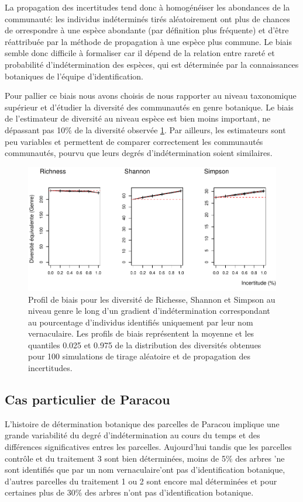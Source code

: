 \documentclass[
  11pt,
  french,
  A4paper,
  extrafontsizes,onecolumn,openright
  ]{memoir}
\begin{document}
La propagation des incertitudes tend donc à homogénéiser les abondances
de la communauté: les individus indéterminés tirés aléatoirement ont
plus de chances de orrespondre à une espèce abondante (par définition
plus fréquente) et d'être réattribuée par la méthode de propagation à
une espèce plus commune. Le biais semble donc difficile à formaliser car
il dépend de la relation entre rareté et probabilité d'indétermination
des espèces, qui est déterminée par la connaissances botaniques de
l'équipe d'identification.

Pour pallier ce biais nous avons choisis de nous rapporter au niveau
taxonomique supérieur et d'étudier la diversité des communautés en genre
botanique. Le biais de l'estimateur de diversité au niveau espèce est
bien moins important, ne dépassant pas 10\% de la diversité observée
\ref{fig:FigTreesGenus}. Par ailleurs, les estimateurs sont peu
variables et permettent de comparer correctement les communautés
communautés, pourvu que leurs degrés d'indétermination soient
similaires.

\begin{figure}

{\centering \includegraphics[width=0.6\linewidth]{MyBook_files/figure-latex/FigTreesGenus-1} 

}

\caption{Profil de biais pour les diversité de Richesse, Shannon et Simpson au niveau genre le long d'un gradient d'indétermination correspondant au pourcentage d'individus identifiés uniquement par leur nom vernaculaire. Les profils de biais représentent la moyenne et les quantiles 0.025 et 0.975 de la distribution des diversités obtenues pour 100 simulations de tirage aléatoire et de propagation des incertitudes.}\label{fig:FigTreesGenus}
\end{figure}

\subsection{Cas particulier de
Paracou}\label{cas-particulier-de-paracou}

L'histoire de détermination botanique des parcelles de Paracou implique
une grande variabilité du degré d'indétermination au cours du temps et
des différences significatives entres les parcelles. Aujourd'hui tandis
que les parcelles contrôle et du traitement 3 sont bien déterminées,
moins de 5\% des arbres 'ne sont identifiés que par un nom
vernaculaire'ont pas d'identification botanique, d'autres parcelles du
traitement 1 ou 2 sont encore mal déterminées et pour certaines plus de
30\% des arbres n'ont pas d'identification botanique.
\end{document}
